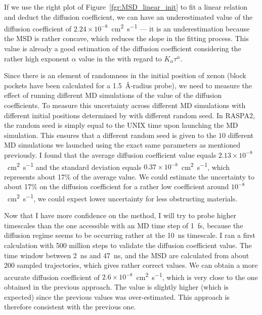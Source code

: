 \documentclass[main]{subfiles}
\begin{document}
If we use the right plot of Figure~\ref{fgr:MSD_linear_init} to fit a linear relation and deduct the diffusion coefficient, we can have an underestimated value of the diffusion coefficient of $2.24\times 10^{-8}$~\si{\square\cm\per\s} --- it is an underestimation because the MSD is rather concave, which reduces the slope in the fitting process. This value is already a good estimation of the diffusion coefficient considering the rather high exponent $\alpha$ value in the with regard to $K_\alpha\tau^\alpha$.

Since there is an element of randomness in the initial position of xenon (block pockets have been calculated for a \SI{1.5}{\angstrom}-radius probe), we need to measure the effect of running different MD simulations of the value of the diffusion coefficients. To measure this uncertainty across different MD simulations with different initial positions determined by with different random seed. In RASPA2, the random seed is simply equal to the UNIX time upon launching the MD simulation. This ensures that a different random seed is given to the $10$ different MD simulations we launched using the exact same parameters as mentioned previously. I found that the average diffusion coefficient value equals $2.13\times 10^{-8}$~\si{\square\cm\per\s} and the standard deviation equals $0.37\times 10^{-8}$~\si{\square\cm\per\s}, which represents about {17\%} of the average value. We could estimate the uncertainty to about {17\%} on the diffusion coefficient for a rather low coefficient around $10^{-8}$~\si{\square\cm\per\s}, we could expect lower uncertainty for less obstructing materials. 

Now that I have more confidence on the method, I will try to probe higher timescales than the one accessible with an MD time step of \SI{1}{\fs}, because the diffusion regime seems to be occurring rather at the \SI{10}{\ns} timescale. I ran a first calculation with 500 million steps to validate the diffusion coefficient value. The time window between \SI{2}{\ns} and \SI{47}{\ns}, and the MSD are calculated from about 200 sampled trajectories, which gives rather correct values. We can obtain a more accurate diffusion coefficient of $2.6\times 10^{-8}$~\si{\square\cm\per\s}, which is very close to the one obtained in the previous approach. The value is slightly higher (which is expected) since the previous values was over-estimated. This approach is therefore consistent with the previous one.
\end{document}
